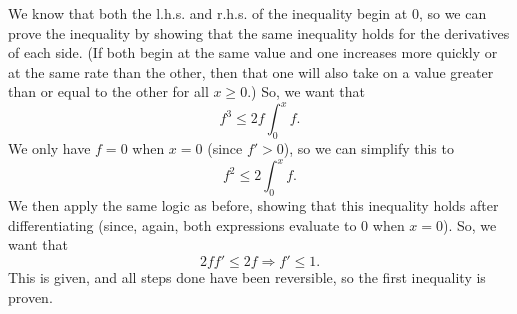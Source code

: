 \begin{problem}[14-9]
We know that both the l.h.s. and r.h.s. of the inequality begin at 0, so we can prove the inequality by showing that the same inequality holds for the derivatives of each side. (If both begin at the same value and one increases more quickly or at the same rate than the other, then that one will also take on a value greater than or equal to the other for all $x\ge0$.) So, we want that 
\[ f^3 \le 2f\int_0^x f. \] 
We only have $f = 0$ when $x = 0$ (since $f' > 0$), so we can simplify this to
\[ f^2 \le 2\int_0^x f. \]
We then apply the same logic as before, showing that this inequality holds after differentiating (since, again, both expressions evaluate to 0 when $x=0$). So, we want that 
\[ 2ff' \le 2f \Rightarrow f' \le 1. \]
This is given, and all steps done have been reversible, so the first inequality is proven. 
\end{problem}